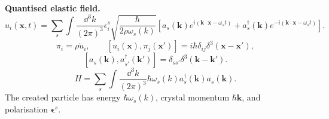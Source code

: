 \noindent\textbf{Quantised elastic field.}
\[
u_i(\mathbf x,t)=\sum_s\int\frac{\dd^3k}{(2\pi)^3}
\epsilon_i^s\sqrt{\frac{\hbar}{2\rho\omega_s(k)}}
\left[a_s(\mathbf k)e^{i(\mathbf k\cdot\mathbf x-\omega_st)}
+a_s^\dagger(\mathbf k)e^{-i(\mathbf k\cdot\mathbf x-\omega_st)}\right].
\]
\[
\pi_i=\rho\dot u_i,\qquad
[u_i(\mathbf x),\pi_j(\mathbf x')]=i\hbar\delta_{ij}\delta^3(\mathbf x-\mathbf x'),
\]
\[
[a_s(\mathbf k),a_{s'}^\dagger(\mathbf k')]=\delta_{ss'}\delta^3(\mathbf k-\mathbf k').
\]
\[
\boxed{H=\sum_s\int\frac{\dd^3k}{(2\pi)^3}
\hbar\omega_s(k)a_s^\dagger(\mathbf k)a_s(\mathbf k)}.
\]
The created particle has energy $\hbar\omega_s(k)$, crystal momentum $\hbar\mathbf k$,
and polarisation $\bm\epsilon^s$. 
